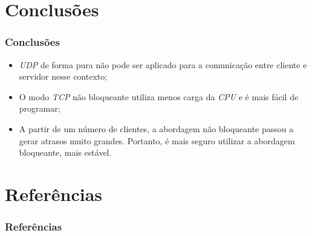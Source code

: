 \documentclass{beamer}
\begin{document}
\section{Conclusões}

\begin{frame} \frametitle{Conclusões}
\begin{itemize}
	\item \justifying \emph{UDP} de forma pura não pode ser aplicado para a comunicação entre cliente e servidor nesse contexto;
	\item \justifying O modo \emph{TCP} não bloqueante utiliza menos carga da \emph{CPU} e é mais fácil de programar;
	\item \justifying A partir de um número de clientes, a abordagem não bloqueante passou a gerar atrasos muito grandes. Portanto, é mais seguro utilizar a abordagem bloqueante, mais estável.
\end{itemize}	
\end{frame}

\section*{Referências}

\begin{frame}[allowframebreaks] \frametitle{Referências}


\end{frame}
\end{document}
